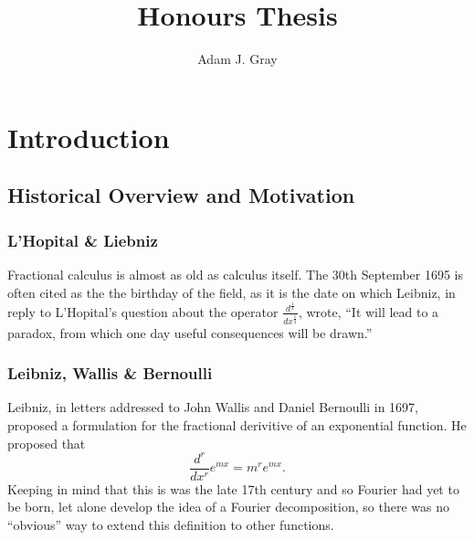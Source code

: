 \documentclass{unswmaths}
\author{Adam J. Gray}
\title{Honours Thesis}
\begin{document}
\unswtitle

\setlength\parindent{0pt}
\setlength{\parskip}{5mm plus4mm minus3mm}

\tableofcontents

\section*{Introduction}
\subsection*{Historical Overview and Motivation}
\subsubsection*{L'Hopital \& Liebniz}
Fractional calculus is almost as old as calculus itself. The 30th September 1695 is often cited as the the birthday of the field,
as it is the date on which Leibniz, in reply to L'Hopital's question about the operator $ \frac{d^\frac{1}{2}}{dx^\frac{1}{2}} $, 
wrote, ``It will lead to a paradox, from which one day useful consequences will be drawn.''
\subsubsection*{Leibniz, Wallis \& Bernoulli}
Leibniz, in letters addressed to John Wallis and Daniel Bernoulli in 1697, proposed a 
formulation for the fractional derivitive of an exponential function.
He proposed that 
$$
    \frac{d^r}{dx^r} e^{mx} = m^r e^{mx}.
$$
Keeping in mind that this is was the late 17th century and so Fourier had yet to 
be born, let alone develop the idea of a Fourier decomposition, so there was
no ``obvious'' way to extend this definition to other functions.
\end{document}
